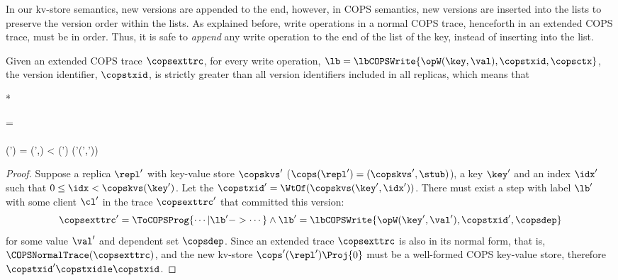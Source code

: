 In our kv-store semantics, new versions are appended to the end,
however, in COPS semantics, new versions are inserted into the lists to preserve
the version order within the lists.
As explained before, write operations in a normal COPS trace,
henceforth in an extended COPS trace, must be in order.
Thus, it is safe to \emph{append} any write operation to the end of the list of the key,
instead of inserting into the list.

\begin{proposition}
\label{prop:cops-append-write}
Given an extended COPS trace \( \copsexttrc \),
for every write operation, \( \lb = \lbCOPSWrite{\opW(\key,\val), \copstxid, \copsctx } \),
the version identifier, \(\copstxid \), is strictly greater than all version identifiers included in all replicas,
which means that
\begin{Formulae}*
\begin{Formula}
\copsexttrc = 
        \\ \land 
        \\ \cops(\repl') = (\copskvs',\stub)
         \leq \idx < \copskvs(\key')
        \implies  \WtOf(\copskvs'(\key',\idx')) \copstxidle \copstxid
\end{Formula}
\end{Formulae}
\end{proposition}
\begin{proof}
Suppose a replica \( \repl' \) with key-value store \( \copskvs' \) (\( \cops(\repl') = (\copskvs',\stub)\)), a key \( \key' \)
and an index \( \idx' \) such that \( 0 \leq \idx < \copskvs(\key') \).
Let the \( \copstxid' = \WtOf(\copskvs(\key',\idx'))\).
There must exist a step with label \( \lb' \) with some client \( \cl' \)
in the trace \( \copsexttrc' \) that committed this version:
\[ 
\copsexttrc' = \ToCOPSProg{ \cdots | \lb' -> \cdots }
\land \lb' = \lbCOPSWrite{\opW(\key',\val'), \copstxid', \copsdep } 
\]
for some value \( \val ' \) and dependent set \(\copsdep \).
Since an extended trace \( \copsexttrc \) is also in its normal form, that is, \( \COPSNormalTrace(\copsexttrc) \),
and the new kv-store \( \cops'(\repl')\Proj{0} \) must be a well-formed COPS key-value store,
therefore \( \copstxid' \copstxidle \copstxid \).
\end{proof}
